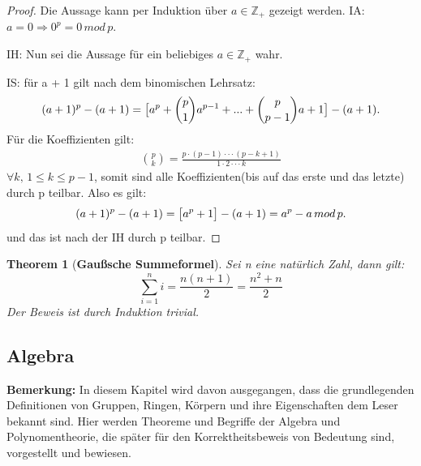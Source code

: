 \documentclass[12pt,oneside]{article}
\newtheorem{theorem}{Theorem}[section]
\theoremstyle{remark}
\theoremstyle{definition}
\begin{document}
\begin{proof}
Die Aussage kann per Induktion über $a \in \mathbb{Z}_{+}$ gezeigt werden.\newline\newline
IA: $a = 0  \Rightarrow 0^p = 0 \, mod \, p$.\newline\newline

IH: Nun sei die Aussage für ein beliebiges $a \in \mathbb{Z}_{+}$ wahr.\newline\newline

IS: für a + 1 gilt nach dem binomischen Lehrsatz:
\begin{align*}
    (a + 1)^p - (a + 1) = \big{[}a^p + {p \choose 1}a^{p - 1} + ... +{p \choose p - 1} a + 1\big{]} - (a + 1).
\end{align*}
Für die Koeffizienten gilt: 
\begin{align*}
    {p \choose k} = \frac{p \cdot (p - 1) \cdot \cdot \cdot (p - k + 1)}{1 \cdot 2 \cdot \cdot \cdot k}
\end{align*}
$\forall k, \,  1 \leq k \leq p - 1$, somit sind alle Koeffizienten(bis auf das erste und das letzte) durch p teilbar.\newline\newline
Also es gilt:
\begin{align*}
(a + 1)^p - (a + 1) = \big{[} a^p + 1 \big{]} - (a + 1) = a^p - a \, mod \, p.
\end{align*}
und das ist nach der IH durch p teilbar.\newline  
\end{proof}

\smallskip

\begin{theorem}[\textbf{Gaußsche Summeformel}]\label{gauss}
Sei n eine natürlich Zahl, dann gilt:
\begin{equation}
    \sum_{i = 1}^{n} i = \frac{n (n + 1)}{2} = \frac{n^2 + n}{2} 
\end{equation}
Der Beweis ist durch Induktion trivial. 
\end{theorem}




\subsection{Algebra}
\textbf{Bemerkung:} In diesem Kapitel wird davon ausgegangen, dass die grundlegenden Definitionen von Gruppen, Ringen, Körpern und ihre Eigenschaften dem Leser bekannt sind. Hier werden Theoreme und Begriffe der Algebra und Polynomentheorie, die später für den Korrektheitsbeweis von Bedeutung sind, vorgestellt und bewiesen.\newline
\end{document}
